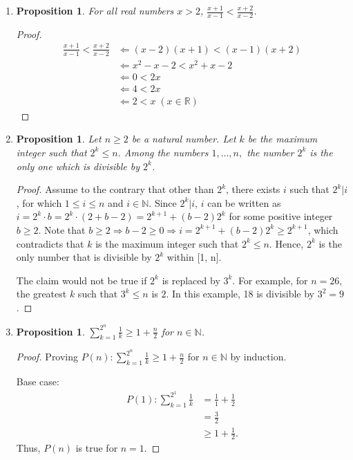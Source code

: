 \documentclass{article}
\newtheorem{prop}[thm]{Proposition}
\begin{document}
\begin{enumerate}[label={(\arabic*)}]
\item 
\begin{prop}
    For all real numbers $x > 2$, $\frac{x+1}{x-1} < \frac{x+2}{x-2}$.
\end{prop}
\begin{proof}
    \begin{align}
        \frac{x+1}{x-1} < \frac{x+2}{x-2} & \Leftarrow (x-2)(x+1) < (x-1)(x+2) \\
        & \Leftarrow x^2 - x - 2 < x^2 + x - 2 \\
        & \Leftarrow 0 < 2x \\
        & \Leftarrow 4 < 2x \\
        & \Leftarrow 2 < x  \; (x \in \mathbb{R})
    \end{align}
\end{proof}

\item 
\begin{prop}
    Let $n \ge 2$ be a natural number. 
    Let $k$ be the maximum integer such that $2^k \le n$. 
    Among the numbers $1,...,n,$ the number $2^k$ is the only one which is divisible by $2^k$.
\end{prop}
\begin{proof}
    Assume to the contrary that other than $2^k$, there exists $i$ such that $2^k | i$, for which $1 \le i \le n$ and $i \in \mathbb{N}$.
    Since $2^k | i$, $i$ can be written as $i = 2^k \cdot b = 2^k \cdot (2 + b - 2) = 2^{k+1} + (b-2)2^k$ for some positive integer $b \ge 2$.
    Note that $b \ge 2 \Rightarrow b-2 \ge 0 \Rightarrow i = 2^{k+1} + (b-2)2^k \ge 2^{k+1}$, which contradicts that $k$ is the maximum integer such that $2^k \le n$.
    Hence, $2^k$ is the only number that is divisible by $2^k$ within [1, n].

    The claim would not be true if $2^k$ is replaced by $3^k$. For example, for $n = 26$, the greatest $k$ such that $3^k \le n$ is $2$. In this example, 18 is divisible by $3^2 = 9$.
\end{proof}

\item 
\begin{prop}
   $\sum_{k=1}^{2^n}\frac{1}{k} \ge 1 + \frac{n}{2}$ for $n \in \mathbb{N}$.
\end{prop}
\begin{proof}
    Proving $P(n): \sum_{k=1}^{2^n}\frac{1}{k} \ge 1 + \frac{n}{2}$ for $n \in \mathbb{N}$ by induction.

    Base case:
    \begin{align}
        P(1) : \sum_{k=1}^{2^1}\frac{1}{k} & = \frac{1}{1} + \frac{1}{2} \\
        & = \frac{3}{2} \\
        & \ge 1 + \frac{1}{2}.
    \end{align}
    Thus, $P(n)$ is true for $n = 1$.


\end{proof}
\end{enumerate}
\end{document}
